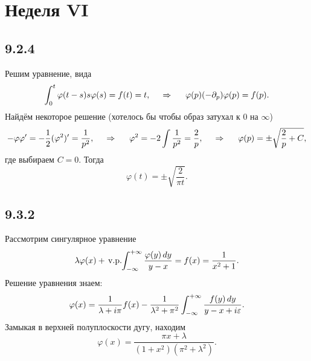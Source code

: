 \section{Неделя VI}

\subsection*{9.2.4}

Решим уравнение, вида
\begin{equation*}
	\int_{0}^{t} \varphi(t-s) s \varphi(s) = f(t) = t,
	\hspace{0.5cm} \Rightarrow \hspace{0.5cm}
	\varphi(p) (-\partial_p) \varphi(p) = f(p).
\end{equation*}
Найдём некоторое решение (хотелось бы чтобы образ затухал к 0 на $\infty$)
\begin{equation*}
	- \varphi \varphi' = - \frac{1}{2} (\varphi^2)' = \frac{1}{p^2},
	\hspace{0.5cm} \Rightarrow \hspace{0.5cm}
	\varphi^2 = - 2 \int \frac{1}{p^2} = \frac{2}{p},
	\hspace{0.5cm} \Rightarrow \hspace{0.5cm}
	\varphi(p) = \pm \sqrt{\frac{2}{p} + C},
\end{equation*}
где выбираем $C=0$. Тогда
\begin{equation*}
	\varphi(t) = \pm \sqrt{\frac{2}{\pi t}}.
\end{equation*}


\subsection*{9.3.2}

Рассмотрим сингулярное уравнение
\begin{equation*}
	\lambda \varphi(x) + \,\textnormal{v.p.}\hspace{-2pt}\int_{-\infty}^{+\infty} \frac{\varphi(y) \, d y}{y-x} = f(x) = \frac{1}{x^2 + 1}.
\end{equation*}
Решение уравнения знаем:
\begin{equation*}
	\varphi(x) = \frac{1}{\lambda + i \pi} f(x) - \frac{1}{\lambda^2 + \pi^2} \int_{-\infty}^{+\infty} \frac{f(y) \, d y}{y-x + i \varepsilon}.
\end{equation*}
Замыкая в верхней полуплоскости дугу, находим
\begin{equation*}
	\varphi(x) = \frac{\pi x + \lambda}{(1 + x^2) (\pi^2 + \lambda^2)}.
\end{equation*}



